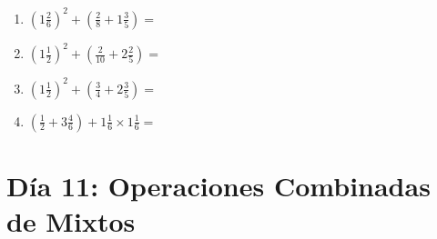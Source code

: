 \documentclass[12pt]{article}
\begin{document}
\begin{enumerate}
\item \large $ (1 \frac{2}{6})^2 + (\frac{2}{8} + 1 \frac{3}{5}) = $ \vspace{1.8cm}
\item \large $ (1 \frac{1}{2})^2 + (\frac{2}{10} + 2 \frac{2}{5}) = $ \vspace{1.8cm}
\item \large $ (1 \frac{1}{2})^2 + (\frac{3}{4} + 2 \frac{3}{5}) = $ \vspace{1.8cm}
\item \large $ (\frac{1}{2} + 3 \frac{4}{6}) + 1 \frac{1}{6} \times 1 \frac{1}{6} = $ \vspace{1.8cm}
\end{enumerate}\newpage
\section*{Día 11: Operaciones Combinadas de Mixtos}
\end{document}
